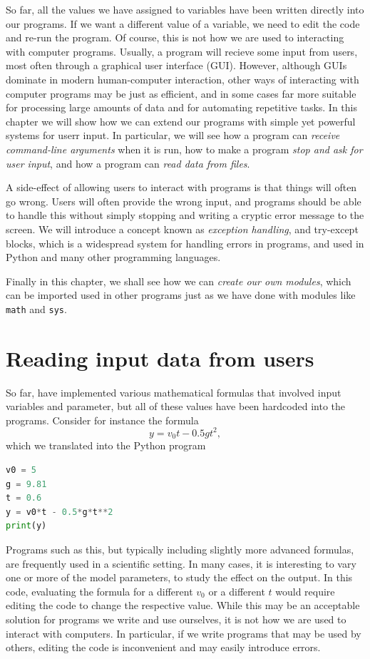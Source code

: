\documentclass[graybox,envcountchap,sectrefs,final]{svmonodo}
\begin{document}
So far, all the values we have assigned to variables have been written directly into our programs. If we want a different
value of a variable, we need to edit the code and re-run the program. Of course, this is not how we are
used to interacting with computer programs. Usually, a program will recieve some input from users, most often through a
graphical user interface (GUI). However, although GUIs dominate in modern human-computer interaction, other ways of interacting
with computer programs may be just as efficient, and in some cases far more suitable for processing large amounts of data
and for automating repetitive tasks. In this chapter we will show how we can extend our programs with simple yet
powerful systems for userr input. In particular, we will see how a program can \emph{receive command-line arguments} when it is run,
how to make a program \emph{stop and ask for user input}, and how a program can \emph{read data from files}.

A side-effect of allowing users to interact with programs is that things will often go wrong. Users will often provide
the wrong input, and programs should be able to handle this without simply stopping and writing a cryptic error message to the
screen. We will introduce a concept known as \emph{exception handling}, and try-except blocks, which is a widespread system for handling
errors in programs, and used in Python and many other programming languages.

Finally in this chapter, we shall see how we can \emph{create our own modules}, which can be imported used in other programs just as we
have done with modules like \texttt{math} and \texttt{sys}.

\section{Reading input data from users}

So far, have implemented various mathematical formulas that involved input variables and parameter, but all of these
values have been hardcoded into the programs. Consider for instance the formula
\[ y = v_0t - 0.5gt^2, \]
which we translated into the Python program
\begin{lstlisting}[language=Python,style=blue1]
v0 = 5
g = 9.81
t = 0.6
y = v0*t - 0.5*g*t**2
print(y)
\end{lstlisting}
Programs such as this, but typically including slightly more advanced formulas, are frequently used in a scientific setting.
In many cases, it is interesting to vary one or more of the model parameters, to study the effect on the output. In this code,
evaluating the formula for a different $v_0$ or a different $t$ would require editing the code to change the respective value.
While this may be an acceptable solution for programs we write and use ourselves, it is not how we are used to interact with
computers. In particular, if we write programs that may be used by others, editing the code is inconvenient and may easily
introduce errors.
\end{document}
